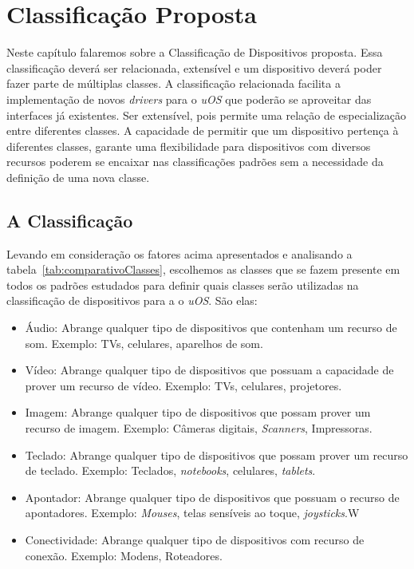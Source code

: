 \chapter{Classificação Proposta}

Neste capítulo falaremos sobre a Classificação de Dispositivos proposta. Essa classificação deverá ser relacionada, extensível e um dispositivo deverá poder fazer parte de múltiplas classes. A classificação relacionada facilita a implementação de novos \emph{drivers} para o \emph{uOS} que poderão se aproveitar das interfaces já existentes. Ser extensível, pois permite uma relação de especialização entre diferentes classes. A capacidade de permitir que um dispositivo pertença à diferentes classes, garante uma flexibilidade para dispositivos com diversos recursos poderem se encaixar nas classificações padrões sem a necessidade da definição de uma nova classe.


\section{A Classificação}
Levando em consideração os fatores acima apresentados e analisando a tabela~\ref{tab:comparativoClasses}, escolhemos as classes que se fazem presente em todos os padrões estudados para definir quais classes serão utilizadas na classificação de dispositivos para a o \emph{uOS}. São elas:

\begin{itemize}
	\item Áudio:
		Abrange qualquer tipo de dispositivos que contenham um recurso de som. Exemplo: TVs, celulares, aparelhos de som.
	\item Vídeo:
		Abrange qualquer tipo de dispositivos que possuam a capacidade de prover um recurso de vídeo. Exemplo: TVs, celulares, projetores.
	\item Imagem:
		Abrange qualquer tipo de dispositivos que possam prover um recurso de imagem. Exemplo: Câmeras digitais, \emph{Scanners}, Impressoras.
	\item Teclado:
		Abrange qualquer tipo de dispositivos que possam prover um recurso de teclado. Exemplo: Teclados, \emph{notebooks}, celulares, \emph{tablets}.
	\item Apontador:
		Abrange qualquer tipo de dispositivos que possuam o recurso de apontadores. Exemplo: \emph{Mouses}, telas sensíveis ao toque, \emph{joysticks}.W
	\item Conectividade:
		Abrange qualquer tipo de dispositivos com recurso de conexão. Exemplo: Modens, Roteadores.
\end{itemize}